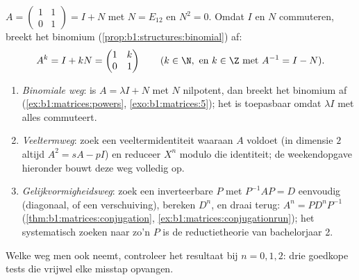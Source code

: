 \begin{example}\label{ex:b1:matrices:powers}
$A = \begin{pmatrix} 1 & 1 \\ 0 & 1\end{pmatrix} = I + N$ met $N =
E_{12}$ en $N^2 = 0$. Omdat $I$ en $N$ commuteren, breekt het
binomium (\cref{prop:b1:structures:binomial}) af:
\[
A^k = I + kN = \begin{pmatrix} 1 & k \\ 0 & 1 \end{pmatrix}
\qquad (k \in \N, \text{ en } k \in \Z \text{ met } A^{-1} = I -
N).
\]
\end{example}

\begin{method}
\label{met:b1:matrices:powers}
\begin{enumerate}
  \item \emph{Binomiale weg}: is $A = \lambda I + N$ met $N$
        nilpotent, dan breekt het binomium af
        (\cref{ex:b1:matrices:powers}, \cref{exo:b1:matrices:5});
        het is toepasbaar omdat $\lambda I$ met alles commuteert.
  \item \emph{Veeltermweg}: zoek een veeltermidentiteit waaraan
        $A$ voldoet (in dimensie $2$ altijd $A^2 = sA - pI$) en
        reduceer $X^n$ modulo die identiteit; de weekendopgave
        hieronder bouwt deze weg volledig op.
  \item \emph{Gelijkvormigheidsweg}: zoek een inverteerbare $P$ met
        $P^{-1}AP = D$ eenvoudig (diagonaal, of een verschuiving),
        bereken $D^n$, en draai terug: $A^n = P D^n P^{-1}$
        (\cref{thm:b1:matrices:conjugation},
        \cref{ex:b1:matrices:conjugationrun}); het systematisch
        zoeken naar zo'n $P$ is de reductietheorie van bachelorjaar
        2.
\end{enumerate}
Welke weg men ook neemt, controleer het resultaat bij $n = 0, 1,
2$: drie goedkope tests die vrijwel elke misstap opvangen.
\end{method}

